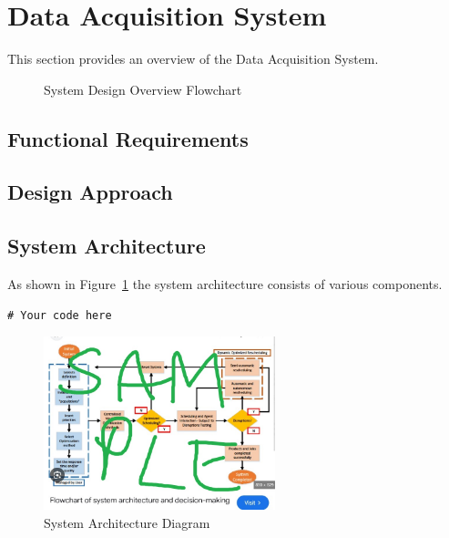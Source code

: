 \section{Data Acquisition System}
This section provides an overview of the Data Acquisition System.

\begin{figure}[H]
    \centering
    \scalebox{0.8}{ %
    }
    \caption{System Design Overview Flowchart}
    \label{fig:decriptiveLabel22} %
\end{figure}


\subsection{Functional Requirements}

\subsection{Design Approach}

\subsection{System Architecture}
As shown in Figure~\ref{fig:decriptiveLabel22} the system architecture consists of various components.

\begin{lstlisting}[style=cstyle, caption=System Architecture Code Example, label=lst:SystemArchitecture8]
# Your code here
\end{lstlisting}

\begin{figure}[htbp] %
    \centering
    \includegraphics[width=0.6\textwidth]{figures/methodology/system_architecture.jpg}
    \caption{System Architecture Diagram}
    \label{fig:system-architecture3}
\end{figure}